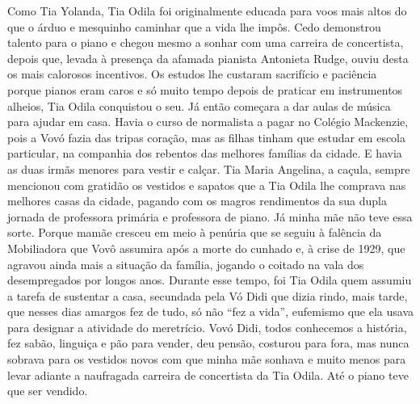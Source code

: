 Como Tia Yolanda, Tia Odila foi originalmente educada para voos mais altos do que o árduo e mesquinho caminhar que a vida lhe impôs.
Cedo demonstrou talento para o piano e chegou mesmo a sonhar com uma carreira de concertista, depois que, levada à presença da afamada pianista Antonieta Rudge, ouviu desta os mais calorosos incentivos.
Os estudos lhe custaram sacrifício e paciência porque pianos eram caros e só muito tempo depois de praticar em instrumentos alheios, Tia Odila conquistou o seu.
Já então começara a dar aulas de música para ajudar em casa.
Havia o curso de normalista a pagar no Colégio Mackenzie, pois a Vovó fazia das tripas coração, mas as filhas tinham que estudar em escola particular, na companhia dos rebentos das melhores famílias da cidade.
E havia as duas irmãs menores para vestir e calçar.
Tia Maria Angelina, a caçula, sempre mencionou com gratidão os vestidos e sapatos que a Tia Odila lhe comprava nas melhores casas da cidade, pagando com os magros rendimentos da sua dupla jornada de professora primária e professora de piano.
Já minha mãe não teve essa sorte.
Porque mamãe cresceu em meio à penúria que se seguiu à falência da Mobiliadora que Vovô assumira após a morte do cunhado e, à crise de 1929, que agravou ainda mais a situação da família, jogando o coitado na vala dos desempregados por longos anos.
Durante esse tempo, foi Tia Odila quem assumiu a tarefa de sustentar a casa, secundada pela Vó Didi que dizia rindo, mais tarde, que nesses dias amargos fez de tudo, só não “fez a vida”, eufemismo que ela usava para designar a atividade do meretrício.
Vovó Didi, todos conhecemos a história, fez sabão, linguiça e pão para vender, deu pensão, costurou para fora, mas nunca sobrava para os vestidos novos com que minha mãe sonhava e muito menos para levar adiante a naufragada carreira de concertista da Tia Odila.
Até o piano teve que ser vendido.

